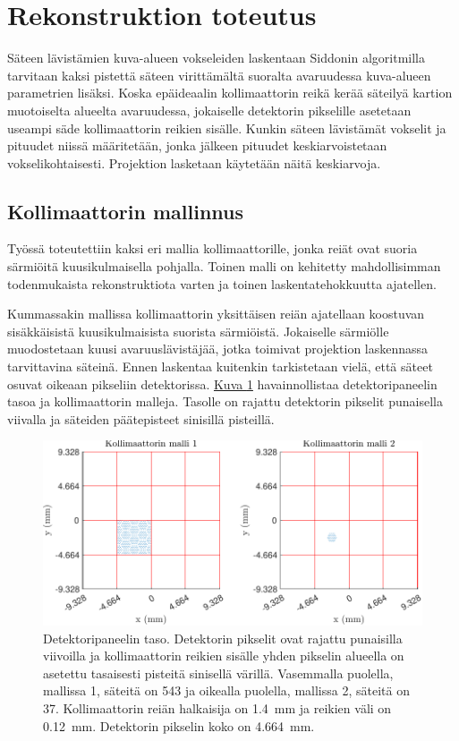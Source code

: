 \section{Rekonstruktion toteutus}
Säteen lävistämien kuva-alueen vokseleiden laskentaan Siddonin algoritmilla tarvitaan kaksi pistettä säteen virittämältä suoralta avaruudessa kuva-alueen parametrien lisäksi\cite{sundermann_fast_1998}. Koska epäideaalin kollimaattorin reikä kerää säteilyä kartion muotoiselta alueelta avaruudessa\cite{cherry_single_2012}, jokaiselle detektorin pikselille asetetaan useampi säde kollimaattorin reikien sisälle. Kunkin säteen lävistämät vokselit ja pituudet niissä määritetään, jonka jälkeen pituudet keskiarvoistetaan vokselikohtaisesti. Projektion lasketaan käytetään näitä keskiarvoja.

\subsection{Kollimaattorin mallinnus}
Työssä toteutettiin kaksi eri mallia kollimaattorille, jonka reiät ovat suoria särmiöitä kuusikulmaisella pohjalla. Toinen malli on kehitetty mahdollisimman todenmukaista rekonstruktiota varten ja toinen laskentatehokkuutta ajatellen.

Kummassakin mallissa kollimaattorin yksittäisen reiän ajatellaan koostuvan sisäkkäisistä kuusikulmaisista suorista särmiöistä. Jokaiselle särmiölle muodostetaan kuusi avaruuslävistäjää, jotka toimivat projektion laskennassa tarvittavina säteinä. Ennen laskentaa kuitenkin tarkistetaan vielä, että säteet osuvat oikeaan pikseliin detektorissa. \hyperref[fig:ray1]{Kuva \ref*{fig:ray1}} havainnollistaa detektoripaneelin tasoa ja kollimaattorin malleja. Tasolle on rajattu detektorin pikselit punaisella viivalla ja säteiden päätepisteet sinisillä pisteillä.

\begin{figure}[t]
    \centering
    \captionsetup{width=.9\textwidth}
    \includegraphics[width=.9\textwidth]{kuvat/2d-kollimaattori.pdf}
    \caption{Detektoripaneelin taso. Detektorin pikselit ovat rajattu punaisilla viivoilla ja kollimaattorin reikien sisälle yhden pikselin alueella on asetettu tasaisesti pisteitä sinisellä värillä. Vasemmalla puolella, mallissa 1, säteitä on 543 ja oikealla puolella, mallissa 2, säteitä on 37. Kollimaattorin reiän halkaisija on \qty{1.4}{\milli\meter} ja reikien väli on \qty{0.12}{\milli\meter}. Detektorin pikselin koko on \qty{4.664}{\milli\meter}.}
    \label{fig:ray1}
\end{figure}

